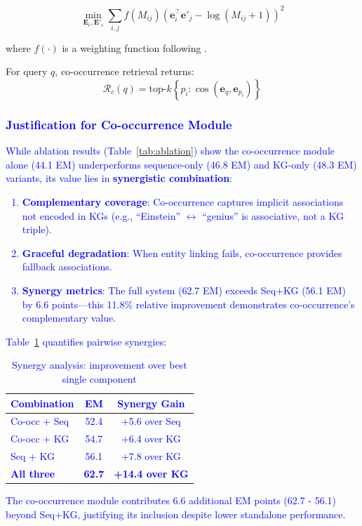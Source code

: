\documentclass[10pt,twocolumn]{article}
\newcommand{\revision}[1]{\textcolor{blue}{#1}}
\begin{document}
\begin{equation}
\min_{\mathbf{E}_c, \mathbf{E}'_c} \sum_{i,j} f(M_{ij}) \left( \mathbf{e}_i^\top \mathbf{e}'_j - \log(M_{ij} + 1) \right)^2
\end{equation}

where $f(\cdot)$ is a weighting function following \cite{pennington2014glove}.

For query $q$, co-occurrence retrieval returns:
\begin{equation}
\mathcal{R}_c(q) = \text{top-}k \left\{ p_i : \cos(\mathbf{e}_q, \mathbf{e}_{p_i}) \right\}
\end{equation}

\revision{
\subsubsection{Justification for Co-occurrence Module}
\label{sec:cooc_justification}

While ablation results (Table~\ref{tab:ablation}) show the co-occurrence module alone (44.1 EM) underperforms sequence-only (46.8 EM) and KG-only (48.3 EM) variants, its value lies in \textbf{synergistic combination}:

\begin{enumerate}
    \item \textbf{Complementary coverage}: Co-occurrence captures implicit associations not encoded in KGs (e.g., ``Einstein'' $\leftrightarrow$ ``genius'' is associative, not a KG triple).
    \item \textbf{Graceful degradation}: When entity linking fails, co-occurrence provides fallback associations.
    \item \textbf{Synergy metrics}: The full system (62.7 EM) exceeds Seq+KG (56.1 EM) by 6.6 points---this 11.8\% relative improvement demonstrates co-occurrence's complementary value.
\end{enumerate}

Table~\ref{tab:synergy} quantifies pairwise synergies:

\begin{table}[h]
\centering
\caption{Synergy analysis: improvement over best single component}
\label{tab:synergy}
\small
\begin{tabular}{@{}lcc@{}}
\toprule
\textbf{Combination} & \textbf{EM} & \textbf{Synergy Gain} \\
\midrule
Co-occ + Seq & 52.4 & +5.6 over Seq \\
Co-occ + KG & 54.7 & +6.4 over KG \\
Seq + KG & 56.1 & +7.8 over KG \\
\textbf{All three} & \textbf{62.7} & \textbf{+14.4 over KG} \\
\bottomrule
\end{tabular}
\end{table}

The co-occurrence module contributes 6.6 additional EM points (62.7 - 56.1) beyond Seq+KG, justifying its inclusion despite lower standalone performance.
}
\end{document}
